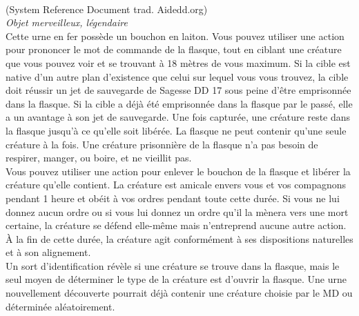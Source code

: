 \\
{\small (System Reference Document trad. Aidedd.org)}\\
{\small \it Objet merveilleux, légendaire}\\
Cette urne en fer possède un bouchon en laiton. Vous pouvez utiliser une action pour prononcer le mot de commande de la flasque, tout en ciblant une créature que vous pouvez voir et se trouvant à 18 mètres de vous maximum. Si la cible est native d'un autre plan d'existence que celui sur lequel vous vous trouvez, la cible doit réussir un jet de sauvegarde de Sagesse DD 17 sous peine d'être emprisonnée dans la flasque. Si la cible a déjà été emprisonnée dans la flasque par le passé, elle a un avantage à son jet de sauvegarde. Une fois capturée, une créature reste dans la flasque jusqu'à ce qu'elle soit libérée. La flasque ne peut contenir qu'une seule créature à la fois. Une créature prisonnière de la flasque n'a pas besoin de respirer, manger, ou boire, et ne vieillit pas. \\
Vous pouvez utiliser une action pour enlever le bouchon de la flasque et libérer la créature qu'elle contient. La créature est amicale envers vous et vos compagnons pendant 1 heure et obéit à vos ordres pendant toute cette durée. Si vous ne lui donnez aucun ordre ou si vous lui donnez un ordre qu'il la mènera vers une mort certaine, la créature se défend elle-même mais n'entreprend aucune autre action. À la fin de cette durée, la créature agit conformément à ses dispositions naturelles et à son alignement. \\
Un sort d'identification révèle si une créature se trouve dans la flasque, mais le seul moyen de déterminer le type de la créature est d'ouvrir la flasque. Une urne nouvellement découverte pourrait déjà contenir une créature choisie par le MD ou déterminée aléatoirement. \\

